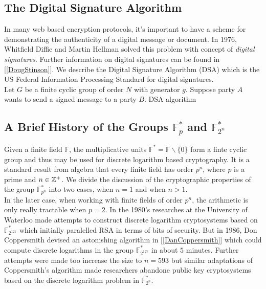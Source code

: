 \subsection{The Digital Signature Algorithm}

In many web based encryption protocols, it's important to have a scheme for demonstrating the authenticity of a digital message or document. In 1976, Whitfield Diffie and Martin Hellman solved this problem with concept of \textit{digital signatures}. Further information on digital signatures can be found in [\ref{DougStinson}]. We describe the Digital Signature Algorithm (DSA) which is the US Federal Information Processing Standard for digital signatures. \\ 

Let $G$ be a finite cyclic group of order $N$ with generator $g$. Suppose party $A$ wants to send a signed message to a party $B$. {\color{blue} DSA algorithm}


\subsection{A Brief History of the Groups $\mathbb{F}_p^*$ and $\mathbb{F}_{2^n}^*$}

Given a finite field $\mathbb{F}$, the multiplicative units $\mathbb{F}^* = \mathbb{F} \backslash \lbrace 0 \rbrace $ form a finte cyclic group and thus may be used for discrete logarithm based cryptography. It is a standard result from algebra that every finite field has order $p^n$, where $p$ is a prime and $n \in \mathbb{Z}^+$. We divide the discussion of the cryptographic properties of the group $\mathbb{F}_{p^n}^*$ into two cases, when $n = 1$ and when $n>1$. \\

In the later case, when working with finite fields of order $p^n$, the arithmetic is only really tractable when $p=2$. In the 1980's researches at the University of Waterloo made attempts to construct discrete logarithm cryptosystems based on $\mathbb{F}_{2^{127}}^*$ which initially paralelled RSA in terms of bits of security. But in 1986, Don Coppersmith devised an astonishing algorithm in [\ref{DanCoppersmith}] which could compute discrete logarithms in the group $\mathbb{F}_{2^{127}}^*$ in about $5$ minutes. Further attempts were made too increase the size to $n=593$ but similar adaptations of Coppersmith's algorithm made researchers abandone public key cryptosystems based on the discrete logarithm problem in $\mathbb{F}_{2^n}^*$. \\

